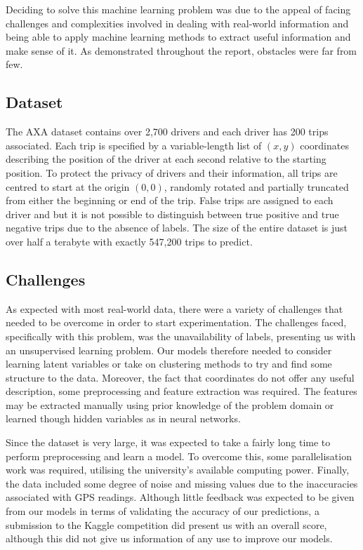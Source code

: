 \documentclass[a4paper, 11pt, twocolumn]{report}
\begin{document}
Deciding to solve this machine learning problem was due to the appeal of facing challenges and complexities involved in dealing with real-world information and being able to apply machine learning methods to extract useful information and make sense of it.
As demonstrated throughout the report, obstacles were far from few.

\subsection{Dataset}

The AXA dataset contains over 2,700 drivers and each driver has 200 trips associated.
Each trip is specified by a variable-length list of $(x,y)$ coordinates describing the position of the driver at each second relative to the starting position.
To protect the privacy of drivers and their information, all trips are centred to start at the origin $(0,0)$, randomly rotated and partially truncated from either the beginning or end of the trip.
False trips are assigned to each driver and but it is not possible to distinguish between true positive and true negative trips due to the absence of labels.
The size of the entire dataset is just over half a terabyte with exactly 547,200 trips to predict.

\subsection{Challenges}

As expected with most real-world data, there were a variety of challenges that needed to be overcome in order to start experimentation.
The challenges faced, specifically with this problem, was the unavailability of labels, presenting us with an unsupervised learning problem.
Our models therefore needed to consider learning latent variables or take on clustering methods to try and find some structure to the data.
Moreover, the fact that coordinates do not offer any useful description, some preprocessing and feature extraction was required.
The features may be extracted manually using prior knowledge of the problem domain or learned though hidden variables as in neural networks.

Since the dataset is very large, it was expected to take a fairly long time to perform preprocessing and learn a model.
To overcome this, some parallelisation work was required, utilising the university's available computing power.
Finally, the data included some degree of noise and missing values due to the inaccuracies associated with GPS readings.
Although little feedback was expected to be given from our models in terms of validating the accuracy of our predictions, a submission to the Kaggle competition did present us with an overall score, although this did not give us information of any use to improve our models.
\end{document}
